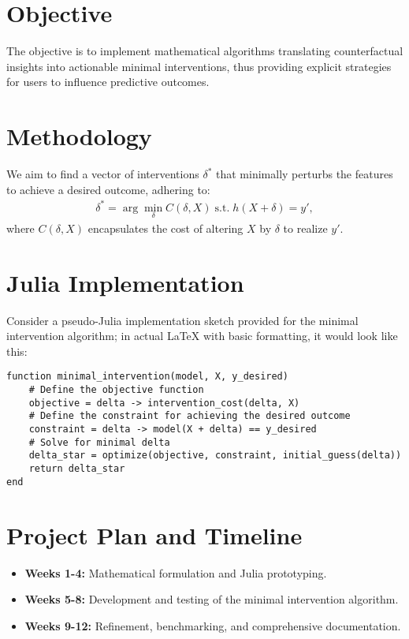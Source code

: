 \documentclass[a4paper,12pt]{article}
\begin{document}
\section{Objective}
The objective is to implement mathematical algorithms translating counterfactual insights into actionable minimal interventions, thus providing explicit strategies for users to influence predictive outcomes.

\section{Methodology}
We aim to find a vector of interventions $\delta^*$ that minimally perturbs the features to achieve a desired outcome, adhering to:
\begin{align}
\delta^* = \arg \min_\delta C(\delta, X) \; \text{s.t.} \; h(X+\delta) = y',
\end{align}
where $C(\delta, X)$ encapsulates the cost of altering $X$ by $\delta$ to realize $y'$.

\section{Julia Implementation}
Consider a pseudo-Julia implementation sketch provided for the minimal intervention algorithm; in actual LaTeX with basic formatting, it would look like this:

\begin{verbatim}
function minimal_intervention(model, X, y_desired)
    # Define the objective function
    objective = delta -> intervention_cost(delta, X)
    # Define the constraint for achieving the desired outcome
    constraint = delta -> model(X + delta) == y_desired
    # Solve for minimal delta
    delta_star = optimize(objective, constraint, initial_guess(delta))
    return delta_star
end
\end{verbatim}

\section{Project Plan and Timeline}
\begin{itemize}
    \item \textbf{Weeks 1-4:} Mathematical formulation and Julia prototyping.
    \item \textbf{Weeks 5-8:} Development and testing of the minimal intervention algorithm.
    \item \textbf{Weeks 9-12:} Refinement, benchmarking, and comprehensive documentation.
\end{itemize}
\end{document}

